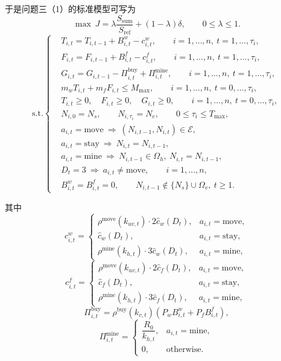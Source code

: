 于是问题三（1）的标准模型可写为
\begin{equation}
\max \ J
=
\lambda \frac{S_{\mathrm{sum}}}{S_{\mathrm{ref}}}
+(1-\lambda)\delta,
\qquad 0\le \lambda \le 1.
\label{eq:q31_obj}
\end{equation}
\[
\mathrm{s.t.}\left\{
\begin{aligned}
&T_{i,t}=T_{i,t-1}+B_{i,t}^w-c_{i,t}^w,\qquad i=1,\dots,n,\ t=1,\dots,\tau_i,\\[1mm]
&F_{i,t}=F_{i,t-1}+B_{i,t}^f-c_{i,t}^f,\qquad i=1,\dots,n,\ t=1,\dots,\tau_i,\\[1mm]
&G_{i,t}=G_{i,t-1}-\Pi_{i,t}^{\mathrm{buy}}+\Pi_{i,t}^{\mathrm{mine}},
\qquad i=1,\dots,n,\ t=1,\dots,\tau_i,\\[1mm]
&m_wT_{i,t}+m_fF_{i,t}\le M_{\max},\qquad i=1,\dots,n,\ t=0,\dots,\tau_i,\\[1mm]
&T_{i,t}\ge 0,\quad F_{i,t}\ge 0,\quad G_{i,t}\ge 0,
\qquad i=1,\dots,n,\ t=0,\dots,\tau_i,\\[1mm]
&N_{i,0}=N_s,\qquad N_{i,\tau_i}=N_e,\qquad 0\le \tau_i\le T_{\max},\\[1mm]
&a_{i,t}=\text{move}\ \Rightarrow\ (N_{i,t-1},N_{i,t})\in\mathcal{E},\\[1mm]
&a_{i,t}=\text{stay}\ \Rightarrow\ N_{i,t}=N_{i,t-1},\\[1mm]
&a_{i,t}=\text{mine}\ \Rightarrow\ N_{i,t-1}\in\Omega_h,\ N_{i,t}=N_{i,t-1},\\[1mm]
&D_t=3\ \Rightarrow\ a_{i,t}\neq\text{move},\qquad i=1,\dots,n,\\[1mm]
&B_{i,t}^w=B_{i,t}^f=0,\qquad N_{i,t-1}\notin \{N_s\}\cup\Omega_v,\ t\ge 1.
\end{aligned}
\right.
\label{eq:q31_cons}
\]

其中
\[
c_{i,t}^w=
\begin{cases}
\rho^{\mathrm{move}}(k_{uv,t})\cdot 2\hat c_w(D_t), & a_{i,t}=\text{move},\\
\hat c_w(D_t), & a_{i,t}=\text{stay},\\
\rho^{\mathrm{mine}}(k_{h,t})\cdot 3\hat c_w(D_t), & a_{i,t}=\text{mine},
\end{cases}
\]
\[
c_{i,t}^f=
\begin{cases}
\rho^{\mathrm{move}}(k_{uv,t})\cdot 2\hat c_f(D_t), & a_{i,t}=\text{move},\\
\hat c_f(D_t), & a_{i,t}=\text{stay},\\
\rho^{\mathrm{mine}}(k_{h,t})\cdot 3\hat c_f(D_t), & a_{i,t}=\text{mine},
\end{cases}
\]
\[
\Pi_{i,t}^{\mathrm{buy}}
=
\rho^{\mathrm{buy}}(k_{v,t})
\left(P_w B_{i,t}^w+P_f B_{i,t}^f\right),
\]
\[
\Pi_{i,t}^{\mathrm{mine}}
=
\begin{cases}
\dfrac{R_0}{k_{h,t}}, & a_{i,t}=\text{mine},\\
0, & \text{otherwise}.
\end{cases}
\]

